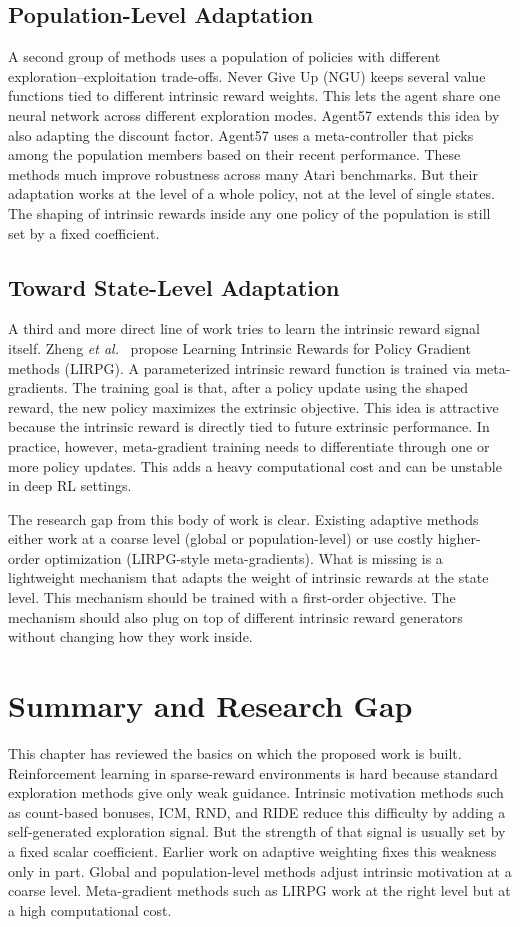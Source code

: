\subsection{Population-Level Adaptation}
A second group of methods uses a population of policies with different exploration--exploitation trade-offs. Never Give Up (NGU) \cite{badia2020ngu} keeps several value functions tied to different intrinsic reward weights. This lets the agent share one neural network across different exploration modes. Agent57 \cite{badia2020agent57} extends this idea by also adapting the discount factor. Agent57 uses a meta-controller that picks among the population members based on their recent performance. These methods much improve robustness across many Atari benchmarks. But their adaptation works at the level of a whole policy, not at the level of single states. The shaping of intrinsic rewards inside any one policy of the population is still set by a fixed coefficient.

\subsection{Toward State-Level Adaptation}
A third and more direct line of work tries to learn the intrinsic reward signal itself. Zheng \textit{et al.}~\cite{zheng2018lirpg} propose Learning Intrinsic Rewards for Policy Gradient methods (LIRPG). A parameterized intrinsic reward function is trained via meta-gradients. The training goal is that, after a policy update using the shaped reward, the new policy maximizes the extrinsic objective. This idea is attractive because the intrinsic reward is directly tied to future extrinsic performance. In practice, however, meta-gradient training needs to differentiate through one or more policy updates. This adds a heavy computational cost and can be unstable in deep RL settings.

The research gap from this body of work is clear. Existing adaptive methods either work at a coarse level (global or population-level) or use costly higher-order optimization (LIRPG-style meta-gradients). What is missing is a lightweight mechanism that adapts the weight of intrinsic rewards at the state level. This mechanism should be trained with a first-order objective. The mechanism should also plug on top of different intrinsic reward generators without changing how they work inside.

\section{Summary and Research Gap}
This chapter has reviewed the basics on which the proposed work is built. Reinforcement learning in sparse-reward environments is hard because standard exploration methods give only weak guidance. Intrinsic motivation methods such as count-based bonuses, ICM, RND, and RIDE reduce this difficulty by adding a self-generated exploration signal. But the strength of that signal is usually set by a fixed scalar coefficient. Earlier work on adaptive weighting fixes this weakness only in part. Global and population-level methods adjust intrinsic motivation at a coarse level. Meta-gradient methods such as LIRPG work at the right level but at a high computational cost.

